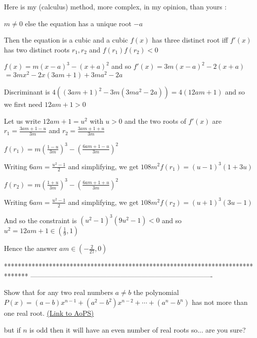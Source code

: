 \begin{solution}
	Here is my (calculus) method, more complex, in my opinion, than yours :

$m\ne 0$ else the equation has a unique root $-a$

Then the equation is a cubic and a cubic $f(x)$ has three distinct root iff $f'(x)$ has two distinct roots $r_1,r_2$ and $f(r_1)f(r_2)<0$

$f(x)=m(x-a)^3-(x+a)^2$ and so $f'(x)=3m(x-a)^2-2(x+a)$ $=3mx^2-2x(3am+1)+3ma^2-2a$

Discriminant is $4((3am+1)^2-3m(3ma^2-2a))=4(12am+1)$ and so we first need $12am+1>0$

Let us write $12am+1=u^2$ with $u>0$ and the two roots of $f'(x)$ are $r_1=\frac{3am+1- u}{3m}$ and $r_2=\frac{3am+1+ u}{3m}$

$f(r_1)=m\left(\frac{1- u}{3m}\right)^3-\left(\frac{6am+1- u}{3m}\right)^2$

Writing $6am=\frac{u^2-1}2$ and simplifying, we get $108m^2f(r_1)=(u-1)^3(1+3u)$

$f(r_2)=m\left(\frac{1+ u}{3m}\right)^3-\left(\frac{6am+1+ u}{3m}\right)^2$

Writing $6am=\frac{u^2-1}2$ and simplifying, we get $108m^2f(r_2)=(u+1)^3(3u-1)$

And so the constraint is $(u^2-1)^3(9u^2-1)<0$ and so $u^2=12am+1\in(\frac 19,1)$

Hence the answer $\boxed{am\in\left(-\frac 2{27},0\right)}$
\end{solution}
*******************************************************************************
-------------------------------------------------------------------------------

\begin{problem}
	Show that for any two real numbers $a\neq b$ the polynomial $ P(x) = (a-b)x^{n-1} + (a^2 - b^2)x^{n-2} + \cdots + (a^{n}- b^{n})  $ has not more than one real root.
	\flushright \href{https://artofproblemsolving.com/community/c6h485853}{(Link to AoPS)}
\end{problem}



\begin{solution}
	but if $ n $ is odd then it will have an even number of real roots so... are you sure?
\end{solution}



